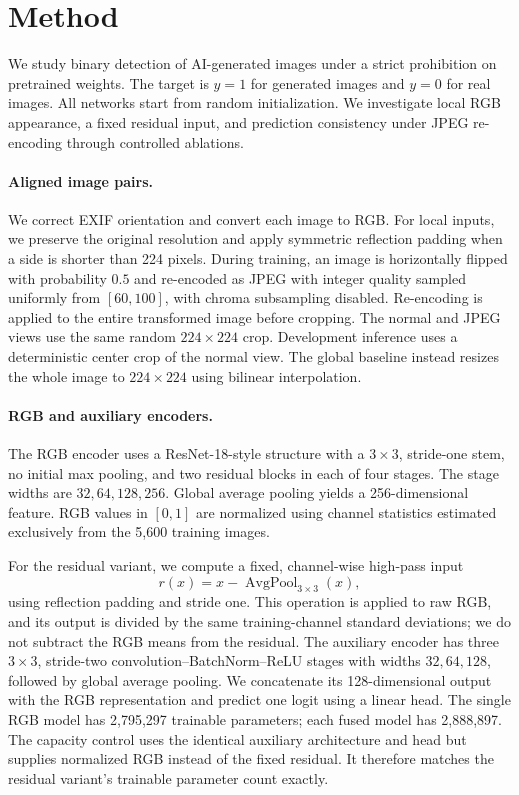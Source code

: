\section{Method}
\label{sec:method}

We study binary detection of AI-generated images under a strict prohibition on
pretrained weights. The target is $y=1$ for generated images and $y=0$ for real
images. All networks start from random initialization. We investigate local RGB
appearance, a fixed residual input, and prediction consistency under JPEG
re-encoding through controlled ablations.

\paragraph{Aligned image pairs.}
We correct EXIF orientation and convert each image to RGB. For local inputs, we
preserve the original resolution and apply symmetric reflection padding when a
side is shorter than 224 pixels. During training, an image is horizontally
flipped with probability $0.5$ and re-encoded as JPEG with integer quality sampled
uniformly from $[60,100]$, with chroma subsampling disabled. Re-encoding is applied
to the entire transformed image before cropping. The normal and JPEG views use
the same random $224\times224$ crop. Development inference uses a deterministic
center crop of the normal view. The global baseline instead resizes the whole
image to $224\times224$ using bilinear interpolation.

\paragraph{RGB and auxiliary encoders.}
The RGB encoder uses a ResNet-18-style structure with a $3\times3$, stride-one
stem, no initial max pooling, and two residual blocks in each of four stages.
The stage widths are $32,64,128,256$. Global average pooling yields a
256-dimensional feature. RGB values in $[0,1]$ are normalized using channel
statistics estimated exclusively from the 5,600 training images.

For the residual variant, we compute a fixed, channel-wise high-pass input
\begin{equation}
 r(x)=x-\operatorname{AvgPool}_{3\times3}(x),
\end{equation}
using reflection padding and stride one. This operation is applied to raw RGB,
and its output is divided by the same training-channel standard deviations;
we do not subtract the RGB means from the residual. The auxiliary encoder has
three $3\times3$, stride-two convolution--BatchNorm--ReLU stages with widths
$32,64,128$, followed by global average pooling. We concatenate its 128-dimensional
output with the RGB representation and predict one logit using a linear head.
The single RGB model has 2,795,297 trainable parameters; each fused model has
2,888,897. The capacity control uses the identical auxiliary architecture and
head but supplies normalized RGB instead of the fixed residual. It therefore
matches the residual variant's trainable parameter count exactly.

